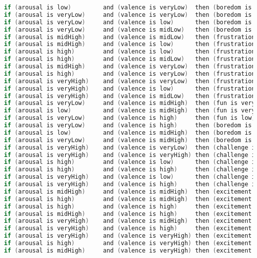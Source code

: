 \begin{lstlisting}[language=c]
if (arousal is low)         and (valence is veryLow)  then (boredom is high)
if (arousal is veryLow)     and (valence is veryLow)  then (boredom is high)
if (arousal is veryLow)     and (valence is low)      then (boredom is high)
if (arousal is veryLow)     and (valence is midLow)   then (boredom is high)
if (arousal is midHigh)     and (valence is midLow)   then (frustration is low)
if (arousal is midHigh)     and (valence is low)      then (frustration is medium)
if (arousal is high)        and (valence is low)      then (frustration is medium)
if (arousal is high)        and (valence is midLow)   then (frustration is medium)
if (arousal is midHigh)     and (valence is veryLow)  then (frustration is high)
if (arousal is high)        and (valence is veryLow)  then (frustration is high)
if (arousal is veryHigh)    and (valence is veryLow)  then (frustration is high)
if (arousal is veryHigh)    and (valence is low)      then (frustration is high)
if (arousal is veryHigh)    and (valence is midLow)   then (frustration is high)
if (arousal is veryLow)     and (valence is midHigh)  then (fun is veryLow)
if (arousal is low)         and (valence is midHigh)  then (fun is veryLow)
if (arousal is veryLow)     and (valence is high)     then (fun is low)
if (arousal is veryLow)     and (valence is high)     then (boredom is low)
if (arousal is low)         and (valence is midHigh)  then (boredom is low)
if (arousal is veryLow)     and (valence is midHigh)  then (boredom is medium)
if (arousal is veryHigh)    and (valence is veryLow)  then (challenge is medium)
if (arousal is veryHigh)    and (valence is veryHigh) then (challenge is medium)
if (arousal is high)        and (valence is low)      then (challenge is low)
if (arousal is high)        and (valence is high)     then (challenge is low)
if (arousal is veryHigh)    and (valence is low)      then (challenge is high)
if (arousal is veryHigh)    and (valence is high)     then (challenge is high)
if (arousal is midHigh)     and (valence is midHigh)  then (excitement is low)
if (arousal is high)        and (valence is midHigh)  then (excitement is medium)
if (arousal is high)        and (valence is high)     then (excitement is medium)
if (arousal is midHigh)     and (valence is high)     then (excitement is medium)
if (arousal is veryHigh)    and (valence is midHigh)  then (excitement is high)
if (arousal is veryHigh)    and (valence is high)     then (excitement is high)
if (arousal is veryHigh)    and (valence is veryHigh) then (excitement is high)
if (arousal is high)        and (valence is veryHigh) then (excitement is high)
if (arousal is midHigh)     and (valence is veryHigh) then (excitement is high)
\end{lstlisting}
